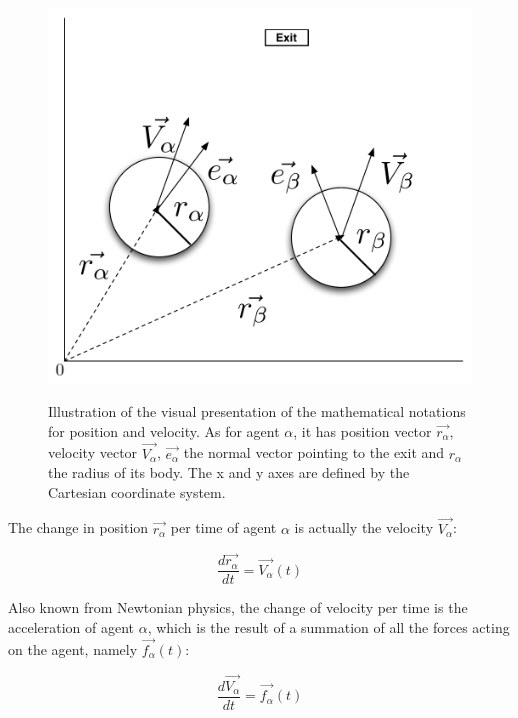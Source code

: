 \begin{figure}[hb]
    \centering
    {\includegraphics[scale=0.35]{Figures/NotationOAgent.pdf}} 
    \caption{Illustration of the visual presentation of the mathematical notations for position and velocity. As for agent $ \alpha $,
	    it has position vector $ \vec{r_{\alpha}} $, velocity vector $ \vec{V_{\alpha}} $, $\vec{e_{\alpha}}$ the normal vector pointing
	    to the exit and  $ r_{\alpha} $ the radius of its body.
	    The x and y axes are defined by the Cartesian coordinate system.}
    \label{NotationOAgent}
\end{figure}

The change in position $ \vec{r_{\alpha}} $ per time of 
agent $\alpha$ is actually the velocity $ \vec{V_{\alpha}} $:

\begin{equation}
		\frac{d \vec{r_{\alpha}}}{dt} = \vec{V_{\alpha}} \left( t \right)
\end{equation}

Also known from Newtonian physics, the change of velocity per time is the acceleration of agent $\alpha$, which is the result of a summation of all the forces acting on the agent, namely $\vec{f_{\alpha}} \left( t \right)$:

\begin{equation}
    \frac{d \vec{V_{\alpha}}}{dt} = \vec{f_{\alpha}} \left( t \right) 
\end{equation}

